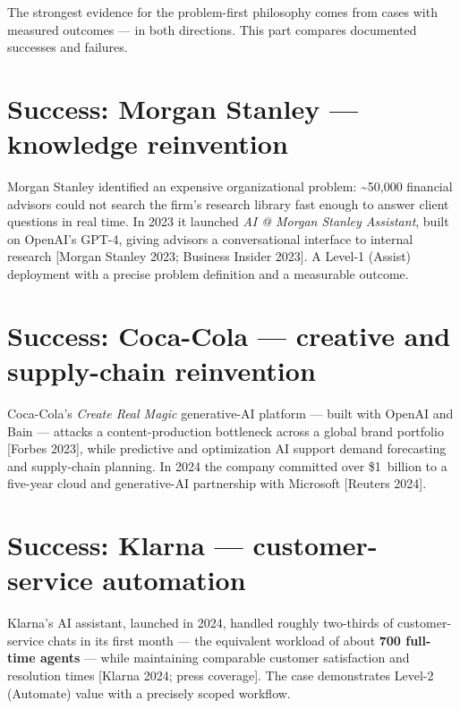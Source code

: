 
The strongest evidence for the problem-first philosophy comes from cases with
measured outcomes — in both directions. This part compares documented
successes and failures.

\section{Success: Morgan Stanley — knowledge reinvention}

Morgan Stanley identified an expensive organizational problem: \~{}50,000
financial advisors could not search the firm's research library fast enough
to answer client questions in real time. In 2023 it launched \textit{AI @
Morgan Stanley Assistant}, built on OpenAI's GPT-4, giving advisors a
conversational interface to internal research [Morgan Stanley 2023; Business
Insider 2023]. A Level-1 (Assist) deployment with a precise problem
definition and a measurable outcome.

\section{Success: Coca-Cola — creative and supply-chain reinvention}

Coca-Cola's \textit{Create Real Magic} generative-AI platform — built with
OpenAI and Bain — attacks a content-production bottleneck across a global
brand portfolio [Forbes 2023], while predictive and optimization AI support
demand forecasting and supply-chain planning. In 2024 the company committed
over \$1~billion to a five-year cloud and generative-AI partnership with
Microsoft [Reuters 2024].

\section{Success: Klarna — customer-service automation}

Klarna's AI assistant, launched in 2024, handled roughly two-thirds of
customer-service chats in its first month — the equivalent workload of about
\textbf{700 full-time agents} — while maintaining comparable customer
satisfaction and resolution times [Klarna 2024; press coverage]. The case
demonstrates Level-2 (Automate) value with a precisely scoped workflow.

